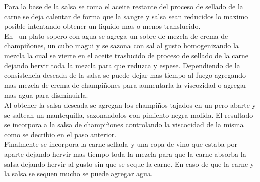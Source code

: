 Para la base de la salsa se roma el aceite restante del proceso de sellado de la carne se deja calentar de forma que la sangre y salsa sean reducidos lo maximo posible intentando obtener un liquido mas o menos translucido.\\

En  un plato sopero con agua se agrega un sobre de mezcla de crema de champiñones, un cubo magui y se sazona con sal al gusto homogenizando la mezcla la cual se vierte en el aceite traslucido de proceso de sellado de la carne dejando hervir toda la mezcla para que reduzca y espese. Dependiendo de la consistencia deseada de la salsa se puede dejar mas tiempo al fuego agregando mas mezcla de crema de champiñones para aumentarla la viscozidad o agregar mas agua para disminuirla.\\

Al obtener la salsa deseada se agregan los champiños tajados en un pero abarte y se saltean un mantequilla, sazonandolos con pimiento negra molida. El resultado se incorpora a la salsa de champiñones controlando la viscocidad de la misma como se decribio en el paso anterior.\\

Finalmente se incorpora la carne sellada y una copa de vino que estaba por aparte dejando hervir mas tiempo toda la mezcla para que la carne absorba la salsa dejando hervir al gusto sin que se seque la carne. En caso de que la carne y la salsa se sequen mucho se puede agregar agua.

